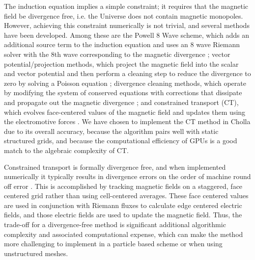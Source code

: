 \documentclass[modern, linenumbers]{aastex631}
\begin{document}
The induction equation implies a simple constraint; it requires that the magnetic field be divergence free, i.e. the Universe does not contain magnetic monopoles. However, achieving this constraint numerically is not trivial, and several methods have been developed. Among these are the Powell 8 Wave scheme, which adds an additional source term to the induction equation and uses an 8 wave Riemann solver with the 8th wave corresponding to the magnetic divergence \citep{Powell1997}; 
vector potential/projection methods, which project the magnetic field into the scalar and vector potential and then perform a cleaning step to reduce the divergence to zero by solving a Poisson equation \citep{brackbill_1980,ryu_1995,Crockett_2005,torrilhon2005locally}; 
divergence cleaning methods, which operate by modifying the system of conserved equations with corrections that dissipate and propagate out the magnetic divergence \citep{dedner_hyperbolic_2002,mignone_2010}; and constrained transport (CT), which evolves face-centered values of the magnetic field and updates them using the electromotive forces \citep{evans_1988}.
We have chosen to implement the CT method in Cholla due to its overall accuracy, because the algorithm pairs well with static structured grids, and because the computational efficiency of GPUs is a good match to the algebraic complexity of CT.

Constrained transport is formally divergence free, and when implemented numerically it typically results in divergence errors on the order of machine round off error \citep{evans_1988, gardiner_2005, stone_athena_2008, stone_2009, zingale_castro_2020, almgren_castro_2020}. This is accomplished by tracking magnetic fields on a staggered, face centered grid rather than using cell-centered averages. These face centered values are used in conjunction with Riemann fluxes to calculate edge centered electric fields, and those electric fields are used to update the magnetic field. Thus, the trade-off for a divergence-free method is significant additional algorithmic complexity and associated computational expense, which can make the method more challenging to implement in a particle based scheme or when using unstructured meshes.
\end{document}
